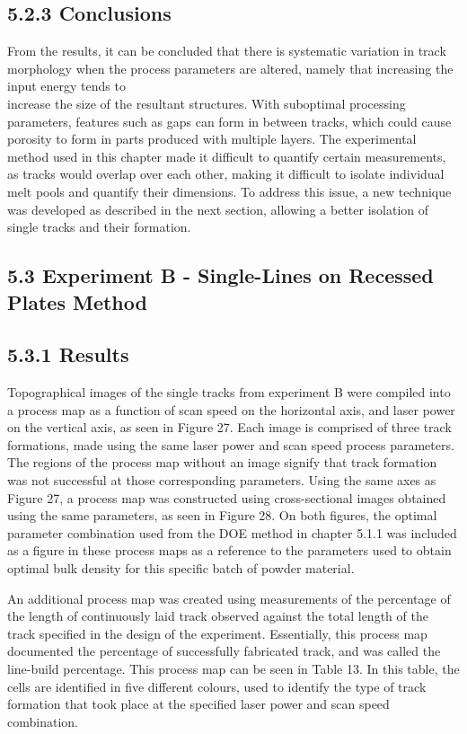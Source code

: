 \documentclass[10pt]{article}
\begin{document}
\subsection*{5.2.3 Conclusions}
From the results, it can be concluded that there is systematic variation in track morphology when the process parameters are altered, namely that increasing the input energy tends to\\
increase the size of the resultant structures. With suboptimal processing parameters, features such as gaps can form in between tracks, which could cause porosity to form in parts produced with multiple layers. The experimental method used in this chapter made it difficult to quantify certain measurements, as tracks would overlap over each other, making it difficult to isolate individual melt pools and quantify their dimensions. To address this issue, a new technique was developed as described in the next section, allowing a better isolation of single tracks and their formation.

\subsection*{5.3 Experiment B - Single-Lines on Recessed Plates Method}
\subsection*{5.3.1 Results}
Topographical images of the single tracks from experiment B were compiled into a process map as a function of scan speed on the horizontal axis, and laser power on the vertical axis, as seen in Figure 27. Each image is comprised of three track formations, made using the same laser power and scan speed process parameters. The regions of the process map without an image signify that track formation was not successful at those corresponding parameters. Using the same axes as Figure 27, a process map was constructed using cross-sectional images obtained using the same parameters, as seen in Figure 28. On both figures, the optimal parameter combination used from the DOE method in chapter 5.1.1 was included as a figure in these process maps as a reference to the parameters used to obtain optimal bulk density for this specific batch of powder material.

An additional process map was created using measurements of the percentage of the length of continuously laid track observed against the total length of the track specified in the design of the experiment. Essentially, this process map documented the percentage of successfully fabricated track, and was called the line-build percentage. This process map can be seen in Table 13. In this table, the cells are identified in five different colours, used to identify the type of track formation that took place at the specified laser power and scan speed combination.
\end{document}
